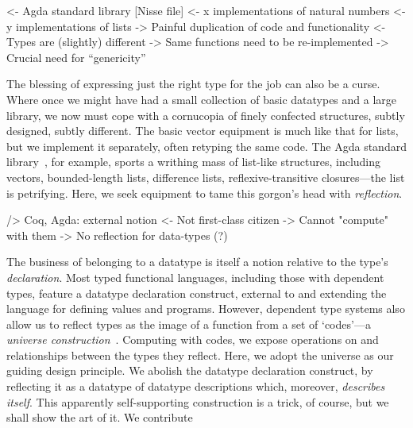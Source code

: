 \documentclass[preprint
              , authoryear
              ]{sigplanconf}
\newenvironment{wstructure}{\comment}{\endcomment}
\begin{document}

\begin{wstructure}
    <- Agda standard library [Nisse file]
        <- x implementations of natural numbers
        <- y implementations of lists
        -> Painful duplication of code and functionality
            <- Types are (slightly) different
                -> Same functions need to be re-implemented 
        -> Crucial need for ``genericity''
\end{wstructure}

The blessing of expressing just the right type for the job can also be
a curse. Where once we might have had a small collection of basic
datatypes and a large library, we now must cope with a cornucopia of
finely confected structures, subtly designed, subtly different. The
basic vector equipment is much like that for lists, but we implement
it separately, often retyping the same code. The Agda standard
library~\cite{nisse:asl}, for example, sports a writhing mass of
list-like structures, including vectors, bounded-length lists,
difference lists, reflexive-transitive closures---the list is
petrifying. Here, we seek equipment to tame this gorgon's head with
\emph{reflection}.

\begin{wstructure}
        /> Coq, Agda: external notion
            <- Not first-class citizen
            -> Cannot "compute" with them
            -> No reflection for data-types (?)
\end{wstructure}

The business of belonging to a datatype is itself a notion
relative to the type's \emph{declaration}. Most typed functional
languages, including those with dependent types, feature a datatype
declaration construct, external to and extending the language for
defining values and programs. However, dependent type systems also
allow us to reflect types as the image of a function from a set of
`codes'---a \emph{universe construction}~\cite{martin-lof:itt}. 
Computing with codes, we expose operations on and
relationships between the types they reflect. Here, we adopt
the universe as our guiding design principle. We abolish the
datatype declaration construct, by reflecting it as a datatype of
datatype descriptions which, moreover, \emph{describes itself}. This
apparently self-supporting construction is a trick, of course, but
we shall show the art of it. We contribute
\end{document}
